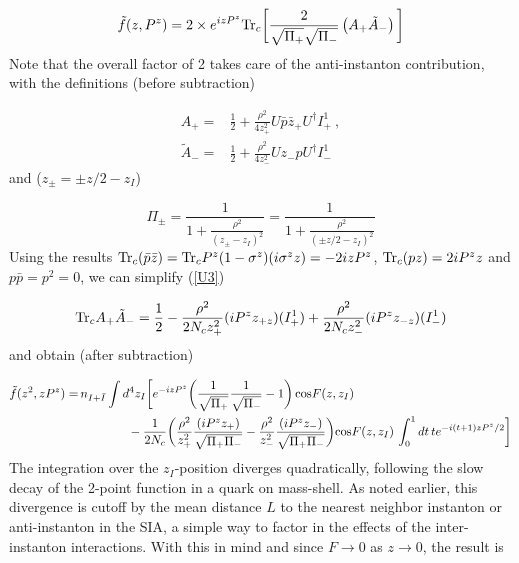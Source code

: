 \documentclass[11pt,aps,amsmath,amssymb,nofootinbib,notitlepage,longbibliography]{revtex4-1}
\newcommand{\be}{\begin{equation}}
\newcommand{\ee}{\end{equation}}
\begin{document}
\begin{align}
\label{U3}
\tilde f(z,P^z)= 2\times e^{izP^z}{\rm Tr}_c\bigg[\frac{2}{{\sqrt{\Pi_{+}}\sqrt{\Pi_{-}}}}\left(A_+\tilde A_-\right) \bigg]
\end{align}
Note that the overall factor of 2 takes care of the anti-instanton contribution, with the definitions (before subtraction)

\begin{align}
\label{U4}
A_+=&\frac{1}{2}+\frac{\rho^2}{4z_+^2}U\bar p \bar z_+ U^{\dagger}I_+^1 \ , \nonumber\\
\tilde A_-=&\frac{1}{2}+\frac{\rho^2}{4z_-^2}Uz_- pU^{\dagger}I_-^1
\end{align}
and ($z_\pm=\pm z/2-z_I$)

\be
\Pi_\pm=\frac 1{1+\frac{\rho^2}{(z_\pm-z_I)^2}}=\frac 1{1+\frac{\rho^2}{(\pm z/2-z_I)^2}}
\ee
Using the results  ${\rm Tr}_c(\bar p \bar z)={\rm Tr}_cP^z(1-\sigma^z)(i\sigma^z z)=-2izP^z$, ${\rm Tr}_c(p z)=2iP^zz$ and $p\bar p=p^2=0$,
we can simplify (\ref{U3})

\begin{align}
{\rm Tr}_c A_+\tilde A_-=\frac{1}{2}-\frac{\rho^2}{2N_cz_+^2}(iP^zz_{+z})(I_+^1) +\frac{\rho^2}{2N_cz_-^2}(iP^zz_{-z})(I_-^1)
\end{align}
and obtain (after subtraction)


\begin{align}
\label{qpdf1}
\tilde f(z^2,zP^z)=&\,{n_{I+\bar I}}\int d^4z_I\bigg[ e^{-izP^z}\bigg(\frac 1{\sqrt{\Pi_+}}\frac 1{\sqrt{\Pi_-}}-1\bigg)\,{\rm cos}F(z, z_I)\nonumber\\
 &\qquad\qquad-\frac 1{2N_c}\bigg(\frac{\rho^2}{z_+^2}\frac{(iP^zz_{+})}{\sqrt{\Pi_+\Pi_-} } -\frac{\rho^2}{z_-^2}\frac{(iP^zz_{-})}{\sqrt{\Pi_+\Pi_-} }\bigg){\rm cos}F(z,z_I)\,
\int_{0}^1  dt\,te^{-i(t+1)zP^z/2}\bigg] \nonumber\\
\end{align}
The integration over the $z_I$-position diverges quadratically,  following  the slow decay of the 2-point function in a quark on mass-shell.
As noted earlier, this divergence is  cutoff by the mean distance $L$ to the nearest neighbor instanton or anti-instanton in the SIA, a simple
way to factor in the effects of the inter-instanton interactions.
With this in mind and since $F\rightarrow 0$ as $z\rightarrow 0$, the result is
\end{document}

